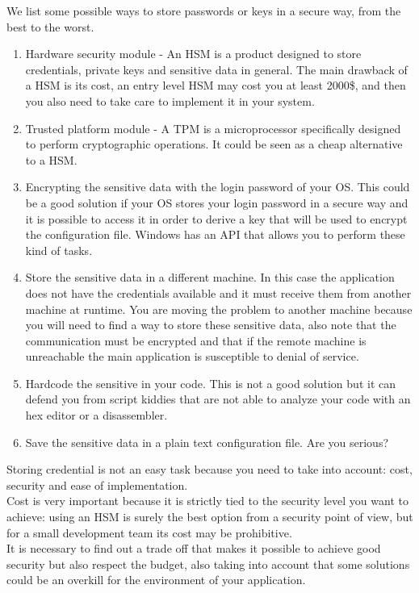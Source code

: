 We list some possible ways to store passwords or keys in a secure way, from the best to the worst.\\
\begin{enumerate}
\item Hardware security module - An HSM is a product designed to store credentials, private keys and sensitive data in general.
The main drawback of a HSM is its cost, an entry level HSM may cost you at least 2000\$, and then you also need to take care to implement it in your system.
\item Trusted platform module - A TPM is a microprocessor specifically designed to perform cryptographic operations.
It could be seen as a cheap alternative to a HSM.
\item Encrypting the sensitive data with the login password of your OS.
This could be a good solution if your OS stores your login password in a secure way and it is possible to access it in order to derive a key that will be used to encrypt the configuration file.
Windows has an API that allows you to perform these kind of tasks.
\item Store the sensitive data in a different machine.
In this case the application does not have the credentials available and it must receive them from another machine at runtime. You are moving the problem to another machine because you will need to find a way to store these sensitive data, also note that the communication must be encrypted and that if the remote machine is unreachable the main application is susceptible to denial of service.
\item Hardcode the sensitive in your code.
This is not a good solution but it can defend you from script kiddies that are not able to analyze your code with an hex editor or a disassembler.
\item Save the sensitive data in a plain text configuration file.
Are you serious?
\end{enumerate}

Storing credential is not an easy task because you need to take into account: cost, security and ease of implementation.\\
Cost is very important because it is strictly tied to the security level you want to achieve: using an HSM is surely the best option from a security point of view, but for a small development team its cost may be prohibitive.\\
It is necessary to find out a trade off that makes it possible to achieve good security but also respect the budget, also taking into account that some solutions could be an overkill for the environment of your application.\\

